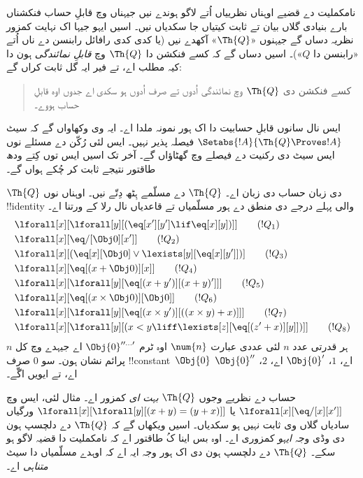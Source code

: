 \documentclass[../../../include/open-logic-section]{subfiles}
\begin{document}

نامکملیت دے قضیے اوہناں نظرییاں اُتے لاگو ہوندے نیں جیہناں وچ
قابلِ حساب فنکشناں بارے بنیادی گلاں بیان تے ثابت کیتیاں جا سکدیاں
نیں۔ اسیں ایہو جیہا اک نہایت کمزور نظریہ دساں گے جیہنوں «$\Th{Q}$»
آکھدے نیں (یا کدی کدی رافائل رابنسن دے ناں اُتے «رابنسن دا $Q$»)۔
اسیں دساں گے کہ کسے فنکشن دا $\Th{Q}$ وچ \emph{قابلِ نمائندگی}
ہون دا کیہ مطلب اے، تے فیر ایہ گل ثابت کراں گے:
\begin{quote}
  کسے فنکشن دی $\Th{Q}$ وچ نمائندگی اُدوں تے صرف اُدوں ہو سکدی اے
جدوں اوہ قابلِ حساب ہووے۔
\end{quote}
ایس نال سانوں قابلِ حسابیت دا اک ہور نمونہ ملدا اے۔ ایہ وی
وکھاواں گے کہ سیٹ $\Setabs{!A}{\Th{Q} \Proves !A}$ فیصلہ پذیر نہیں۔
ایس لئی رُکّن دے مسئلے نوں ایس سیٹ دی رکنیت دے فیصلے وچ
گھٹاؤاں گے۔ آخر تک اسیں ایس توں کِتے ودھ طاقتور نتیجے ثابت
کر چُکے ہواں گے۔

$\Th{Q}$ دی زبان حساب دی زبان اے۔ $\Th{Q}$ دے مسلّمے ہِٹھ دِتّے نیں۔
اوہناں نوں !!{identity} والی پہلے درجے دی منطق دے ہور مسلّمیاں
تے قاعدیاں نال رلا کے ورتنا اے۔
\begin{align*}
& \lforall[x][\lforall[y][(\eq[x'][y'] \lif \eq[x][y])]] \tag{$!Q_1$}\\
& \lforall[x][\eq/[\Obj 0][x']] \tag{$!Q_2$}\\
& \lforall[x][(\eq[x][\Obj 0] \lor \lexists[y][\eq[x][y']])] \tag{$!Q_3$}\\
& \lforall[x][\eq[(x + \Obj 0)][x]] \tag{$!Q_4$}\\
& \lforall[x][\lforall[y][\eq[(x + y')][(x + y)']]] \tag{$!Q_5$}\\
& \lforall[x][\eq[(x \times \Obj 0)][\Obj 0]] \tag{$!Q_6$}\\
& \lforall[x][\lforall[y][\eq[(x \times y')][((x \times y) + x)]]] \tag{$!Q_7$}\\
& \lforall[x][\lforall[y][(x < y \liff \lexists[z][\eq[(z' + x)][y]])]] \tag{$!Q_8$}
\end{align*}
ہر قدرتی عدد $n$ لئی عددی عبارت $\num{n}$ اوہ ٹرم
$\Obj{0}^{\prime\prime\ldots\prime}$ اے جیہدے وچ کل $n$ پرائم نشان
ہون۔ سو $\num{0}$ صرف
!!{constant}~$\Obj{0}$ اے، $\num{1}$،
$\Obj{0}'$ اے، $\num{2}$، $\Obj{0}''$ اے، تے ایویں اگّے۔

حساب دے نظریے وجوں $\Th{Q}$ \emph{بہت ای} کمزور اے۔ مثال لئی،
ایس وچ $\lforall[x][\eq/[x][x']]$ یا
$\lforall[x][\lforall[y][(x + y) = (y + x)]]$ ورگیاں سادیاں
گلاں وی ثابت نہیں ہو سکدیاں۔ اسیں ویکھاں گے کہ $\Th{Q}$ دے
دلچسپ ہون دی وڈی وجہ \emph{ایہو} کمزوری اے۔ اوہ بس اینا کُ
طاقتور اے کہ نامکملیت دا قضیہ لاگو ہو سکے۔ $\Th{Q}$ دے
دلچسپ ہون دی اک ہور وجہ ایہ اے کہ اوہدے مسلّمیاں دا سیٹ
\emph{متناہی} اے۔
\end{document}
